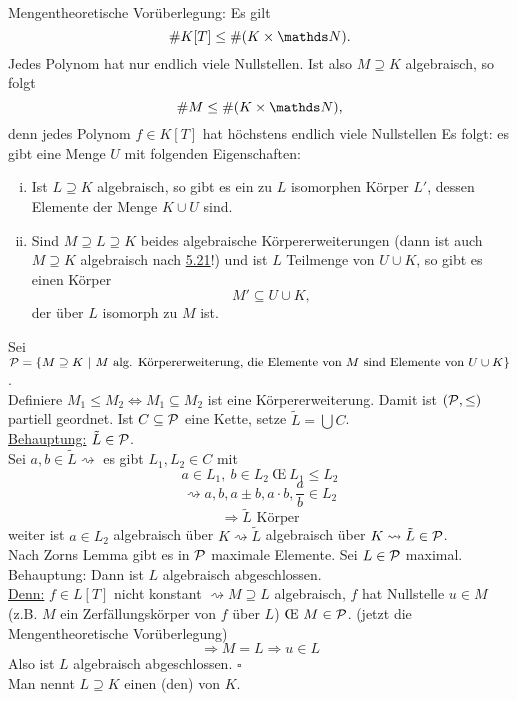 \\
Mengentheoretische Vorüberlegung:
Es gilt
\[
\#K[T]\le \#(K\times \N).
\]
Jedes Polynom hat nur endlich viele Nullstellen.
Ist also $M\supseteq K$ algebraisch, so folgt
\[
\#M\le \#(K\times \N),
\]
denn jedes Polynom $f\in K[T]$ hat höchstens endlich viele Nullstellen
Es folgt:
es gibt eine Menge $U$ mit folgenden Eigenschaften:
\begin{enumerate}[(i)]
	\item Ist $L\supseteq K$ algebraisch, so gibt es ein zu $L$ isomorphen Körper $L'$, dessen Elemente der Menge $K\cup U$ sind.
	\item Sind $M\supseteq L\supseteq K$ beides algebraische Körpererweiterungen (dann ist auch $M\supseteq K$ algebraisch nach \hyperref[sub:alg_huelle]{5.21}!) und ist $L$ Teilmenge von $U\cup K$, so gibt es einen Körper
	\[
	M'\subseteq U\cup K,
	\] 
	der über $L$ isomorph zu $M$ ist.
\end{enumerate}

Sei $\mathcal{P}=\left\{M\supseteq K~|~M\text{ alg. Körpererweiterung, die Elemente von $M$ sind Elemente von }U\cup K\right\}$.\\
Definiere $M_1\le M_2 \Leftrightarrow M_1\subseteq M_2$ ist eine Körpererweiterung.
Damit ist $(\mathcal{P},\le)$ partiell geordnet.
Ist $C\subseteq \mathcal{P}$ eine Kette, setze $\tilde{L}=\bigcup C$.\\
\uline{Behauptung:} $\tilde{L}\in \mathcal{P}$.\\
Sei $a,b\in \tilde{L} \rightsquigarrow$ es gibt $L_1,L_2\in C$ mit
\[
a\in L_1,~b\in L_2 ~\text{\OE}~ L_1\le L_2
\]
\[
\rightsquigarrow a,b,a\pm b,a\cdot b,\frac{a}{b} \in L_2
\]
\[
\Rightarrow \tilde{L} \text{ Körper}
\]
weiter ist $a\in L_2$ algebraisch über $K\rightsquigarrow \tilde{L}$ algebraisch über $K\rightsquigarrow \tilde{L}\in \mathcal{P}$.\\
Nach Zorns Lemma gibt es in $\mathcal{P}$ maximale Elemente.
Sei $L\in \mathcal{P}$ maximal.
Behauptung: Dann ist $L$ algebraisch abgeschlossen.\\
\uline{Denn:}
$f\in L[T]$ nicht konstant $\rightsquigarrow M\supseteq L$ algebraisch, $f$ hat Nullstelle $u\in M$ (z.B. $M$ ein Zerfällungskörper von $f$ über $L$) $\text{\OE}~ M\in \mc{P}$.
(jetzt die Mengentheoretische Vorüberlegung)
\[
\Rightarrow M=L \Rightarrow u\in L
\]
Also ist $L$ algebraisch abgeschlossen.
\hfill $\square$\\

Man nennt $L\supseteq K$ einen (den)  von $K$.

